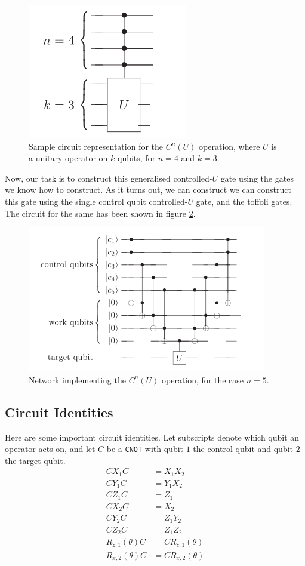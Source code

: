 \documentclass[conference]{IEEEtran}
\begin{document}
\begin{figure}[htbp]
\centerline{\includegraphics[scale = 0.5]{Images/gen_u_example.png}}
\caption{Sample circuit representation for the $C^{n}(U)$ operation, where $U$ is a unitary operator on $k$ qubits, for
$n = 4$ and $k = 3$.}
\label{gen-u-ex}
\end{figure}

Now, our task is to construct this generalised controlled-$U$ gate using the gates we know how to construct.
As it turns out, we can construct we can construct this gate using the single control qubit controlled-$U$ gate, and the toffoli gates. 
The circuit for the same has been shown in figure \ref{u-construct}.

\begin{figure}[htbp]
\centerline{\includegraphics[scale = 0.5]{Images/u-construct.png}}
\caption{Network implementing the $C^{n}(U)$ operation, for the case $n = 5$.}
\label{u-construct}
\end{figure}

\subsection{Circuit Identities}
Here are some important circuit identities. Let subscripts denote which qubit an operator acts on, and let 
$C$ be a \verb|CNOT| with qubit $1$ the control qubit and qubit $2$ the target qubit. 
\begin{align*}
    CX_{1}C &= X_{1}X_{2} \\ 
    CY_{1}C &= Y_{1}X_{2} \\ 
    CZ_{1}C &= Z_{1} \\ 
    CX_{2}C &= X_{2} \\ 
    CY_{2}C &= Z_{1}Y_{2} \\
    CZ_{2}C &= Z_{1}Z_{2} \\
    R_{z,1}(\theta)C &= CR_{z,1}(\theta) \\ 
    R_{x,2}(\theta)C &= CR_{x,2}(\theta)
\end{align*} 
\end{document}
